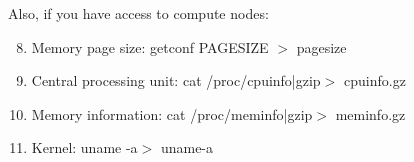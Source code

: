 \documentclass{article}
\begin{document}
\noindent
Also, if you have access to compute nodes:

\begin{enumerate}
\setcounter{enumi}{7}
   \item Memory page size: getconf PAGESIZE $>$ pagesize
   \item Central processing unit: cat /proc/cpuinfo|gzip$>$ cpuinfo.gz
   \item Memory information: cat /proc/meminfo|gzip$>$ meminfo.gz
   \item Kernel: uname -a$>$ uname-a 
\end{enumerate}
\end{document}
